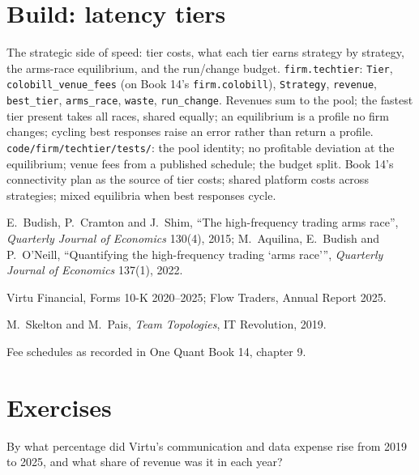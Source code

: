 \section{Build: latency tiers}\label{bld:fm:technology-strategy:techtier}

\begin{build}
 The strategic side of speed: tier costs, what each tier earns strategy by strategy, the arms-race equilibrium, and the run/change
budget.
 \texttt{firm.techtier}: \texttt{Tier}, \texttt{colobill\_venue\_fees} (on Book 14's \texttt{firm.colobill}), \texttt{Strategy},
\texttt{revenue}, \texttt{best\_tier}, \texttt{arms\_race}, \texttt{waste}, \texttt{run\_change}.
 Revenues sum to the pool; the fastest tier present takes all races, shared equally; an equilibrium is a profile no firm changes;
cycling best responses raise an error rather than return a profile.
 \texttt{code/firm/techtier/tests/}: the pool identity; no profitable deviation at the equilibrium; venue fees from a
published schedule; the budget split.
 Book 14's connectivity plan as the source of tier costs; shared platform costs across strategies; mixed equilibria when best
responses cycle.
\end{build}

\begin{omsources}
\item E.~Budish, P.~Cramton and J.~Shim, ``The high-frequency trading arms race'', \emph{Quarterly Journal of Economics} 130(4), 2015;
M.~Aquilina, E.~Budish and P.~O'Neill, ``Quantifying the high-frequency trading `arms race''', \emph{Quarterly Journal of Economics} 137(1), 2022.
\item Virtu Financial, Forms 10-K 2020--2025; Flow Traders, Annual Report 2025.
\item M.~Skelton and M.~Pais, \emph{Team Topologies}, IT Revolution, 2019.
\item Fee schedules as recorded in One Quant Book 14, chapter 9.
\end{omsources}

\section{Exercises}

\begin{exercise}[$\star$]\label{exo:fm:technology-strategy:1}
By what percentage did Virtu's communication and data expense rise from 2019 to 2025, and what share of revenue was it in each year?
\end{exercise}

